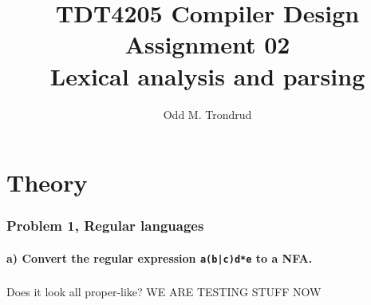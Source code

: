 \documentclass[12pt]{article}
\title{TDT4205 Compiler Design\\
Assignment 02\\
\textbf{Lexical analysis and parsing}}
\author{Odd M. Trondrud}
\begin{document}
\maketitle

\part{Theory}
\section{Problem 1, Regular languages}
\subsection{a) Convert the regular expression \texttt{a(b|c)d*e} to a NFA.}
\section{}
Does it look all proper-like?
\newpage
WE ARE TESTING STUFF NOW 
\end{document}
